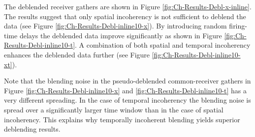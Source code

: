 The deblended receiver gathers are shown in Figure \ref{fig:Ch-Results-Debl-x-inline}. The results suggest that only spatial incoherency is not sufficient to deblend the data (see Figure \ref{fig:Ch-Results-Debl-inline10-x}). By introducing random firing-time delays the deblended data improve significantly as shown in Figure \ref{fig:Ch-Results-Debl-inline10-t}. A combination of both spatial and temporal incoherency enhances the deblended data further (see Figure \ref{fig:Ch-Results-Debl-inline10-xt}).

Note that the blending noise in the pseudo-deblended common-receiver gathers in Figure \ref{fig:Ch-Results-Debl-inline10-x} and \ref{fig:Ch-Results-Debl-inline10-t} has a very different spreading. In the case of temporal incoherency the blending noise is spread over a significantly larger time window than in the case of spatial incoherency. This explains why temporally incoherent blending yields superior deblending results.


